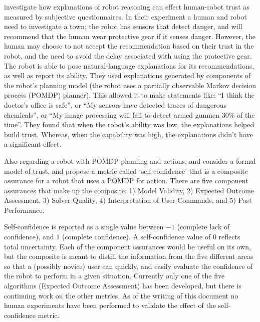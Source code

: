 \citet{Wang2016-id} investigate how explanations of robot reasoning can effect human-robot trust as measured by subjective questionnaires. In their experiment a human and robot need to investigate a town; the robot has sensors that detect danger, and will recommend that the human wear protective gear if it senses danger. However, the human may choose to not accept the recommendation based on their trust in the robot, and the need to avoid the delay associated with using the protective gear. The robot is able to pose natural-language explanations for its recommendations, as well as report its ability. They used explanations generated by components of the robot's planning model (the robot uses a partially observable Markov decision process (POMDP) planner). This allowed it to make statements like: ``I think the doctor's office is safe'', or ``My sensors have detected traces of dangerous chemicals'', or ``My image processing will fail to detect armed gunmen 30\% of the time''. They found that when the robot's ability was low, the explanations helped build trust. Whereas, when the capability was high, the explanations didn't have a significant effect. 


Also regarding a robot with POMDP planning and actions, \citet{Aitken2016-fb} and \citet{Aitken2016-cv} consider a formal model of trust, and propose a metric called `self-confidence' that is a composite assurance for a robot that uses a POMDP for action. There are five component assurances that make up the composite: 1) Model Validity, 2) Expected Outcome Assessment, 3) Solver Quality, 4) Interpretation of User Commands, and 5) Past Performance. 

Self-confidence is reported as a single value between $-1$ (complete lack of confidence), and $1$ (complete confidence). A self-confidence value of $0$ reflects total uncertainty. Each of the component assurances would be useful on its own, but the composite is meant to distill the information from the five different areas so that a (possibly novice) user can quickly, and easily evaluate the confidence of the robot to perform in a given situation. Currently only one of the five algorithms (Expected Outcome Assessment) has been developed, but there is continuing work on the other metrics. As of the writing of this document no human experiments have been performed to validate the effect of the self-confidence metric.

